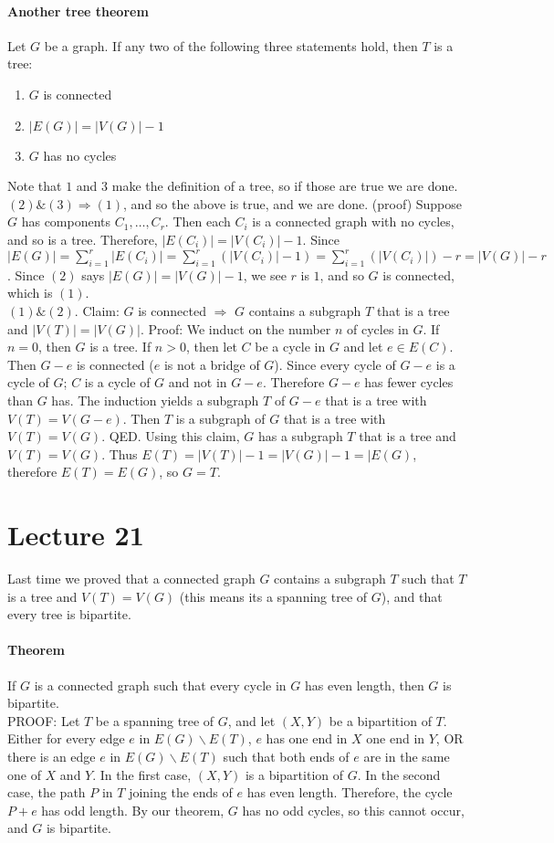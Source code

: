 \documentclass[10pt,letter]{article}
\begin{document}
\paragraph{Another tree theorem}
Let $G$ be a graph. If any two of the following three statements hold, then $T$ is a tree: 
\begin{enumerate}
    \item $G$ is connected 
    \item $|E(G)|=|V(G)|-1$ 
    \item $G$ has no cycles
\end{enumerate}
Note that $1$ and $3$ make the definition of a tree, so if those are true we are done.  \\ 
$(2) \& (3)\Rightarrow (1)$, and so the above is true, and we are done. (proof) Suppose $G$ has components $C_1,\ldots,C_r$. Then each $C_i$ is a connected graph with no cycles, and so is a tree. Therefore, $|E(C_i)|=|V(C_i)|-1$. Since $|E(G)|=\sum_{i=1}^r|E(C_i)|=\sum_{i=1}^r(|V(C_i)|-1)=\sum_{i=1}^r(|V(C_i)|)-r=|V(G)|-r$. Since $(2)$ says $|E(G)|=|V(G)|-1$, we see $r$ is $1$, and so $G$ is connected, which is $(1)$. \\ 
$(1)\&(2)$. Claim: $G$ is connected $\Rightarrow$ $G$ contains a subgraph $T$ that is a tree and $|V(T)|=|V(G)|$. Proof: We induct on the number $n$ of cycles in $G$. If $n=0$, then $G$ is a tree. If $n>0$, then let $C$ be a cycle in $G$ and let $e\in E(C)$. Then $G-e$ is connected ($e$ is not a bridge of $G$). Since every cycle of $G-e$ is a cycle of $G$; $C$ is a cycle of $G$ and not in $G-e$. Therefore $G-e$ has fewer cycles than $G$ has. The induction yields a subgraph $T$ of $G-e$ that is a tree with $V(T)=V(G-e)$. Then $T$ is a subgraph of $G$ that is a tree with $V(T)=V(G)$. QED. Using this claim, $G$ has a subgraph $T$ that is a tree and $V(T)=V(G)$. Thus $E(T)=|V(T)|-1=|V(G)|-1=|E(G)$, therefore $E(T)=E(G)$, so $G=T$. 

\section*{Lecture 21}
Last time we proved that a connected graph $G$ contains a subgraph $T$ such that $T$ is a tree and $V(T)=V(G)$ (this means its a spanning tree of $G$), and that every tree is bipartite. 
\paragraph{Theorem}
If $G$ is a connected graph such that every cycle in $G$ has even length, then $G$ is bipartite. \\ 
PROOF: Let $T$ be a spanning tree of $G$, and let $(X,Y)$ be a bipartition of $T$. Either for every edge $e$ in $E(G)\backslash E(T)$, $e$ has one end in $X$ one end in $Y$, OR there is an edge $e$ in $E(G)\backslash E(T)$ such that both ends of $e$ are in the same one of $X$ and $Y$. In the first case, $(X,Y)$ is a bipartition of $G$. In the second case, the path $P$ in $T$ joining the ends of $e$ has even length. Therefore, the cycle $P+e$ has odd length. By our theorem, $G$ has no odd cycles, so this cannot occur, and $G$ is bipartite. 
\end{document}
